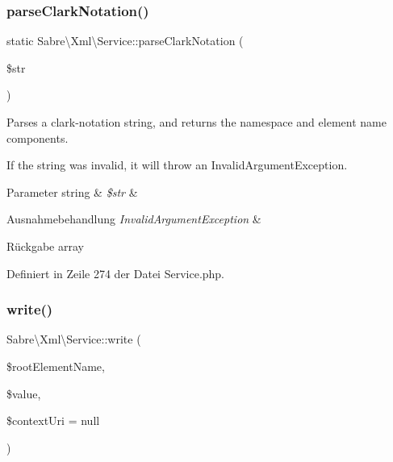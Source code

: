 \subsubsection{\texorpdfstring{parse\+Clark\+Notation()}{parseClarkNotation()}}
{\footnotesize\ttfamily static Sabre\textbackslash{}\+Xml\textbackslash{}\+Service\+::parse\+Clark\+Notation (\begin{DoxyParamCaption}\item[{}]{\$str }\end{DoxyParamCaption})\hspace{0.3cm}{\ttfamily [static]}}

Parses a clark-\/notation string, and returns the namespace and element name components.

If the string was invalid, it will throw an Invalid\+Argument\+Exception.


\begin{DoxyParams}[1]{Parameter}
string & {\em \$str} & \\
\hline
\end{DoxyParams}

\begin{DoxyExceptions}{Ausnahmebehandlung}
{\em Invalid\+Argument\+Exception} & \\
\hline
\end{DoxyExceptions}
\begin{DoxyReturn}{Rückgabe}
array 
\end{DoxyReturn}


Definiert in Zeile 274 der Datei Service.\+php.

\mbox{\label{class_sabre_1_1_xml_1_1_service_a92af6e84cf7218c36bcbaaef4156b033}} 
\subsubsection{\texorpdfstring{write()}{write()}}
{\footnotesize\ttfamily Sabre\textbackslash{}\+Xml\textbackslash{}\+Service\+::write (\begin{DoxyParamCaption}\item[{}]{\$root\+Element\+Name,  }\item[{}]{\$value,  }\item[{}]{\$context\+Uri = {\ttfamily null} }\end{DoxyParamCaption})}

